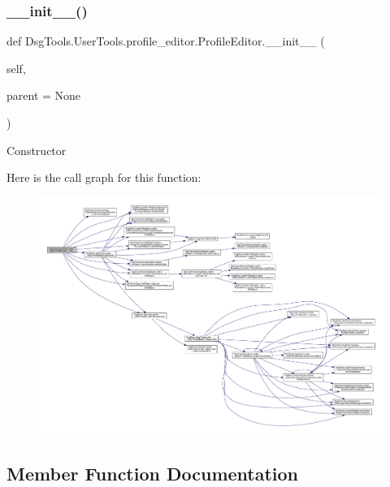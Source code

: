 \subsubsection{\texorpdfstring{\+\_\+\+\_\+init\+\_\+\+\_\+()}{\_\_init\_\_()}}
{\footnotesize\ttfamily def Dsg\+Tools.\+User\+Tools.\+profile\+\_\+editor.\+Profile\+Editor.\+\_\+\+\_\+init\+\_\+\+\_\+ (\begin{DoxyParamCaption}\item[{}]{self,  }\item[{}]{parent = {\ttfamily None} }\end{DoxyParamCaption})}

\begin{DoxyVerb}Constructor
\end{DoxyVerb}
 Here is the call graph for this function\+:
\nopagebreak
\begin{figure}[H]
\begin{center}
\leavevmode
\includegraphics[width=350pt]{class_dsg_tools_1_1_user_tools_1_1profile__editor_1_1_profile_editor_a55f5ced4df1165a00e9a7e6124bae983_cgraph}
\end{center}
\end{figure}


\subsection{Member Function Documentation}
\mbox{\label{class_dsg_tools_1_1_user_tools_1_1profile__editor_1_1_profile_editor_a4570169729936da5eefeb4db5878c7e4}} 
